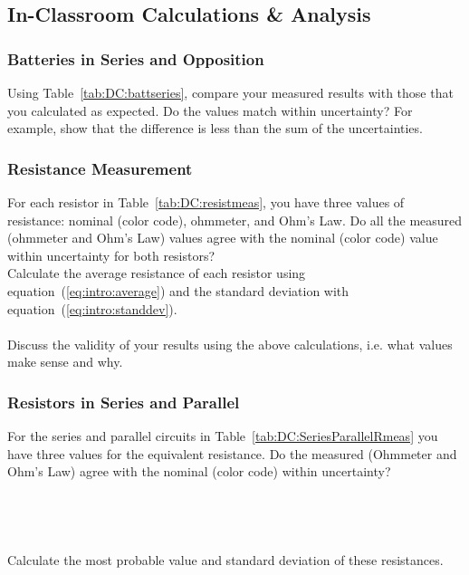 \subsection{In-Classroom Calculations \& Analysis}

\noindent
\subsubsection{Batteries in Series and Opposition}

\noindent Using Table~\ref{tab:DC:battseries}, compare your measured results 
with those that you calculated as expected.
Do the values match within uncertainty?  For example, show that 
the difference is less than the sum of the uncertainties. \\
\vspace*{2cm}

\subsubsection{Resistance Measurement}
\noindent For each resistor in Table~\ref{tab:DC:resistmeas}, you have three 
values of resistance: nominal (color 
code), ohmmeter, and Ohm's Law.  Do all the measured (ohmmeter and Ohm's
Law) values agree with the nominal (color code) 
value within uncertainty for both resistors? \\
\vfill
\pagebreak 
\noindent Calculate the average resistance of each resistor using 
equation~(\ref{eq:intro:average}) and the standard deviation with 
equation~(\ref{eq:intro:standdev}).\\  
\vspace*{4cm}\\
\noindent Discuss the validity of your results using the above calculations,
i.e. what values make sense and why.  \\


\subsubsection{Resistors in Series and Parallel}

\noindent For the series and parallel circuits in 
Table~\ref{tab:DC:SeriesParallelRmeas} you have three values for the
equivalent resistance.  Do the measured (Ohmmeter and Ohm's Law)
agree with the nominal (color code) within uncertainty? \\
\\ 
\vspace*{1cm} \\
\\ 
\vspace*{1.3cm} \\
\newpage
\noindent Calculate the most probable value and standard deviation of
these resistances.  \\
\\ 
\vspace*{1cm} \\
\\ 
\vspace*{1.3cm} \\                                               

